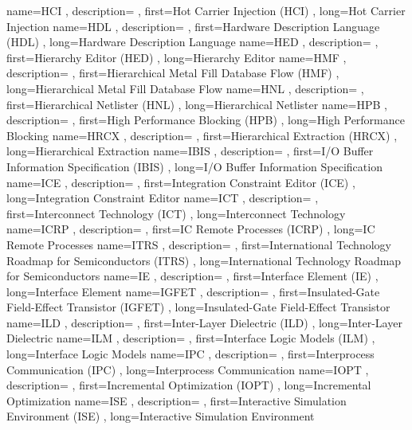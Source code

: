 { name={HCI}
, description={}
, first={Hot Carrier Injection (HCI)}
, long={Hot Carrier Injection}
}
{ name={HDL}
, description={}
, first={Hardware Description Language (HDL)}
, long={Hardware Description Language}
}
{ name={HED}
, description={}
, first={Hierarchy Editor (HED)}
, long={Hierarchy Editor}
}
{ name={HMF}
, description={}
, first={Hierarchical Metal Fill Database Flow (HMF)}
, long={Hierarchical Metal Fill Database Flow}
}
{ name={HNL}
, description={}
, first={Hierarchical Netlister (HNL)}
, long={Hierarchical Netlister}
}
{ name={HPB}
, description={}
, first={High Performance Blocking (HPB)}
, long={High Performance Blocking}
}
{ name={HRCX}
, description={}
, first={Hierarchical Extraction (HRCX)}
, long={Hierarchical Extraction}
}
{ name={IBIS}
, description={}
, first={I/O Buffer Information Specification (IBIS)}
, long={I/O Buffer Information Specification}
}
{ name={ICE}
, description={}
, first={Integration Constraint Editor (ICE)}
, long={Integration Constraint Editor}
}
{ name={ICT}
, description={}
, first={Interconnect Technology (ICT)}
, long={Interconnect Technology}
}
{ name={ICRP}
, description={}
, first={IC Remote Processes (ICRP)}
, long={IC Remote Processes}
}
{ name={ITRS}
, description={}
, first={International Technology Roadmap for Semiconductors (ITRS)}
, long={International Technology Roadmap for Semiconductors}
}
{ name={IE}
, description={}
, first={Interface Element (IE)}
, long={Interface Element}
}
{ name={IGFET}
, description={}
, first={Insulated-Gate Field-Effect Transistor (IGFET)}
, long={Insulated-Gate Field-Effect Transistor}
}
{ name={ILD}
, description={}
, first={Inter-Layer Dielectric (ILD)}
, long={Inter-Layer Dielectric}
}
{ name={ILM}
, description={}
, first={Interface Logic Models (ILM)}
, long={Interface Logic Models}
}
{ name={IPC}
, description={}
, first={Interprocess Communication (IPC)}
, long={Interprocess Communication}
}
{ name={IOPT}
, description={}
, first={Incremental Optimization (IOPT)}
, long={Incremental Optimization}
}
{ name={ISE}
, description={}
, first={Interactive Simulation Environment (ISE)}
, long={Interactive Simulation Environment}
}
